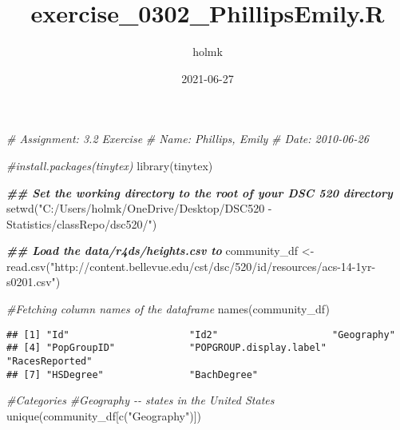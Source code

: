 \documentclass[
]{article}
\title{exercise\_0302\_PhillipsEmily.R}
\author{holmk}
\date{2021-06-27}
\newenvironment{Shaded}{\begin{snugshade}}{\end{snugshade}}
\newcommand{\CommentTok}[1]{\textcolor[rgb]{0.56,0.35,0.01}{\textit{#1}}}
\newcommand{\DocumentationTok}[1]{\textcolor[rgb]{0.56,0.35,0.01}{\textbf{\textit{#1}}}}
\newcommand{\FunctionTok}[1]{\textcolor[rgb]{0.00,0.00,0.00}{#1}}
\newcommand{\NormalTok}[1]{#1}
\newcommand{\OtherTok}[1]{\textcolor[rgb]{0.56,0.35,0.01}{#1}}
\newcommand{\StringTok}[1]{\textcolor[rgb]{0.31,0.60,0.02}{#1}}
\begin{document}
\maketitle

\begin{Shaded}
\begin{Highlighting}[]
\CommentTok{\# Assignment: 3.2 Exercise}
\CommentTok{\# Name: Phillips, Emily}
\CommentTok{\# Date: 2010{-}06{-}26}

\CommentTok{\#install.packages(\textquotesingle{}tinytex\textquotesingle{})}
\FunctionTok{library}\NormalTok{(tinytex)}

\DocumentationTok{\#\# Set the working directory to the root of your DSC 520 directory}
\FunctionTok{setwd}\NormalTok{(}\StringTok{"C:/Users/holmk/OneDrive/Desktop/DSC520 {-} Statistics/classRepo/dsc520/"}\NormalTok{)}

\DocumentationTok{\#\# Load the \textasciigrave{}data/r4ds/heights.csv\textasciigrave{} to}
\NormalTok{community\_df }\OtherTok{\textless{}{-}} \FunctionTok{read.csv}\NormalTok{(}\StringTok{"http://content.bellevue.edu/cst/dsc/520/id/resources/acs{-}14{-}1yr{-}s0201.csv"}\NormalTok{)}

\CommentTok{\#Fetching column names of the dataframe}
\FunctionTok{names}\NormalTok{(community\_df)}
\end{Highlighting}
\end{Shaded}

\begin{verbatim}
## [1] "Id"                     "Id2"                    "Geography"             
## [4] "PopGroupID"             "POPGROUP.display.label" "RacesReported"         
## [7] "HSDegree"               "BachDegree"
\end{verbatim}

\begin{Shaded}
\begin{Highlighting}[]
\CommentTok{\#Categories}
\CommentTok{\#Geography {-}{-} states in the United States}
\FunctionTok{unique}\NormalTok{(community\_df[}\FunctionTok{c}\NormalTok{(}\StringTok{"Geography"}\NormalTok{)])}
\end{Highlighting}
\end{Shaded}
\end{document}
